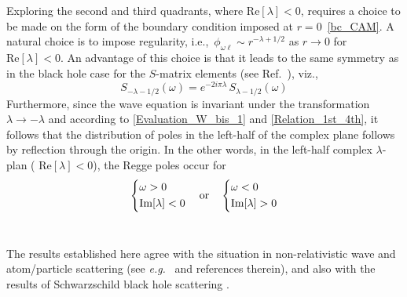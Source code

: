 \documentclass[aps,prd,longbibliography,reprint,twocolumn,amsmath,amssymb,amsfonts,showpacs,footnote,superscriptaddress]{revtex4-1}%
\begin{document}
Exploring the second and third quadrants, where $\text{Re}[{\lambda}] < 0$, requires a choice to be made on the form of the boundary condition imposed at $r=0$~\eqref{bc_CAM}. A natural choice is to impose regularity, i.e.,~$\phi_{\omega\ell} \sim r^{-\lambda+1/2}$ as $r \rightarrow 0$ for $\text{Re} [\lambda] < 0$. An advantage of this choice is that it leads to the same symmetry as in the black hole case for the $S$-matrix elements (see Ref.~\cite{Andersson:1994rk,Folacci:2019cmc}), viz.,
\begin{equation}\label{Matrix_S_CAM_symm}
S_{-\lambda -1/2}(\omega) =  e^{-2i \pi \lambda} \, S_{\lambda -1/2}(\omega)
\end{equation}
Furthermore, since the wave equation is invariant under the transformation $\lambda \rightarrow -\lambda$ and according to \eqref{Evaluation_W_bis_1} and \eqref{Relation_1st_4th}, it follows that the distribution of poles in the left-half of the complex plane follows by reflection through the origin. In the other words, in the left-half complex $\lambda$-plan ( $\text{Re}[\lambda] < 0 $), the Regge poles occur for
\begin{equation}
    \begin{dcases}
        \omega>0 \\
        \text{Im}[\lambda]<0
     \end{dcases}
\quad\text{or}\quad
    \begin{dcases}
      \omega<0 \\
        \text{Im}[\lambda]>0
    \end{dcases}
\end{equation}\

The results established here agree with the situation in non-relativistic wave and atom/particle scattering (see \textit{e.g.}~\cite{Newton:1982qc,Bottino1962} and references therein), and also with the results of Schwarzschild black hole scattering \cite{Andersson:1994rk,Decanini:2009mu}.




\end{document}
